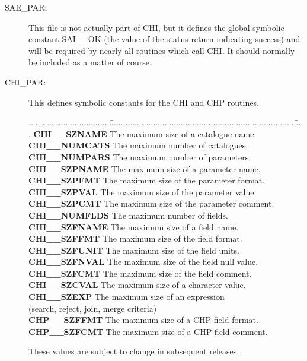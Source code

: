 \begin{description}

\item [SAE\_PAR:]
This file is not actually part of CHI, but it defines the global symbolic
constant SAI\_\_OK (the value of the status return indicating success) and will
be required by nearly all routines which call CHI. It should normally be
included as a matter of course.

\item [CHI\_PAR:]
This defines symbolic constants for the CHI and CHP routines.

\begin{tabbing}
....................................\=................................................................................\=....\kill
{\bf CHI\_\_SZNAME}    \>The maximum size of a catalogue name.     \\
{\bf CHI\_\_NUMCATS}   \>The maximum number of catalogues.         \\
{\bf CHI\_\_NUMPARS}   \>The maximum number of parameters.         \\
{\bf CHI\_\_SZPNAME}   \>The maximum size of a parameter name.     \\
{\bf CHI\_\_SZPFMT}    \>The maximum size of the parameter format. \\
{\bf CHI\_\_SZPVAL}    \>The maximum size of the parameter value.  \\
{\bf CHI\_\_SZPCMT}    \>The maximum size of the parameter comment.\\
{\bf CHI\_\_NUMFLDS}   \>The maximum number of fields.             \\
{\bf CHI\_\_SZFNAME}   \>The maximum size of a field name.         \\
{\bf CHI\_\_SZFFMT}    \>The maximum size of the field format.     \\
{\bf CHI\_\_SZFUNIT}   \>The maximum size of the field units.      \\
{\bf CHI\_\_SZFNVAL}   \>The maximum size of the field null value. \\
{\bf CHI\_\_SZFCMT}    \>The maximum size of the field comment.    \\
{\bf CHI\_\_SZCVAL}    \>The maximum size of a character value.    \\
{\bf CHI\_\_SZEXP}     \>The maximum size of an expression         \\
                       \>(search, reject, join, merge criteria)\\
{\bf CHP\_\_SZFFMT}    \>The maximum size of a CHP field format.     \\
{\bf CHP\_\_SZFCMT}    \>The maximum size of a CHP field comment.    \\
\end{tabbing}

These values are subject to change in subsequent releases.
\end{description}

